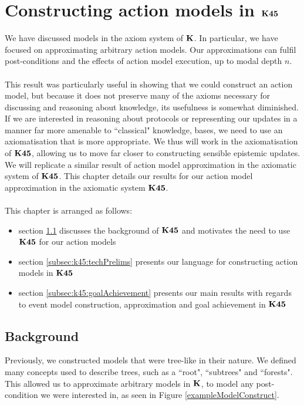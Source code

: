 \chapter{Constructing action models in $\bf K45$} \label{chapter:k45}

We have discussed models in the axiom system of $\bf K$.
In particular, we have focused on approximating arbitrary action models.
Our approximations can fulfil post-conditions and the effects of action model execution, up to modal
depth $n$.\\
\\
This result was particularly useful in showing that we could construct an action model, but because
it does not preserve many of the axioms necessary for discussing and reasoning about knowledge, its
usefulness is somewhat diminished.
If we are interested in reasoning about protocols or representing our updates in a manner far more
amenable to ``classical" knowledge, bases, we need to use an axiomatisation that is more
appropriate.
We thus will work in the axiomatisation of $\bf K45$, allowing us to move far closer to constructing
sensible epistemic updates.
We will replicate a similar result of action model approximation in the axiomatic system
of $\bf K45$.
This chapter details our results for our action model approximation in the axiomatic system
$\bf K45$.\\
\\
This chapter is arranged as follows:
\begin{itemize}
	\item section \ref{subsec:k45:background} discusses the background of $\bf K45$ and motivates the
		need to use $\bf K45$ for our action models
	\item section \ref{subsec:k45:techPrelims} presents our language for constructing action models in
		$\bf K45$
	\item section \ref{subsec:k45:goalAchievement} presents our main results with regards to event
		model construction, approximation and goal achievement in $\bf K45$
\end{itemize}

\section{Background} \label{subsec:k45:background}

Previously, we constructed models that were tree-like in their nature.
We defined many concepts used to describe trees, such as a ``root", ``subtrees" and ``forests".
This allowed us to approximate arbitrary models in $\bf K$, to model any post-condition we
were interested in, as seen in Figure \ref{exampleModelConstruct}.

